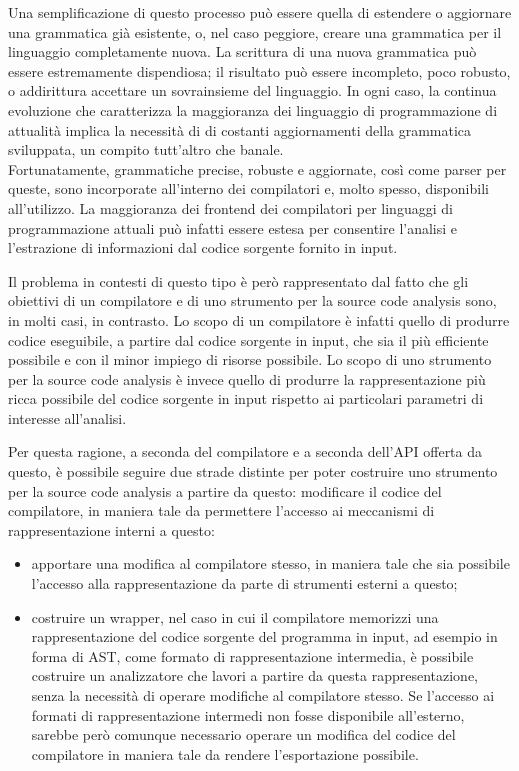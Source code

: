 Una semplificazione di questo processo può essere quella di estendere o
aggiornare una grammatica già esistente, o, nel caso peggiore, creare una
grammatica per il linguaggio completamente nuova. La scrittura di una nuova
grammatica può essere estremamente dispendiosa; il risultato può essere
incompleto, poco robusto, o addirittura accettare un sovrainsieme del
linguaggio. In ogni caso, la continua evoluzione che caratterizza la
maggioranza dei linguaggio di programmazione di attualità implica la necessità
di di costanti aggiornamenti della grammatica sviluppata, un compito tutt’altro
che banale.\\

Fortunatamente, grammatiche precise, robuste e aggiornate, così come parser per
queste, sono incorporate all’interno dei compilatori e, molto spesso,
disponibili all’utilizzo. La maggioranza dei frontend dei compilatori per
linguaggi di programmazione attuali può infatti essere estesa per consentire
l’analisi e l’estrazione di informazioni dal codice sorgente fornito in input.

Il problema in contesti di questo tipo è
però rappresentato dal fatto che gli obiettivi di un compilatore e di uno
strumento per la source code analysis sono, in molti casi, in contrasto. Lo
scopo di un compilatore è infatti quello di produrre codice eseguibile, a
partire dal codice sorgente in input, che sia il più efficiente possibile e con
il minor impiego di risorse possibile. Lo scopo di uno strumento per la source
code analysis è invece quello di produrre la rappresentazione più ricca
possibile del codice sorgente in input rispetto ai particolari parametri di
interesse all’analisi.

Per questa ragione, a seconda del compilatore e a
seconda dell’API offerta da questo, è possibile seguire due strade distinte per
poter costruire uno strumento per la source code analysis a partire da questo:
modificare il codice del compilatore, in maniera tale da permettere l’accesso
ai meccanismi di rappresentazione interni a questo: 

\begin{itemize}

\item apportare una modifica al compilatore stesso, in maniera tale che sia
possibile l'accesso alla rappresentazione da parte di strumenti esterni a
questo;

\item costruire un wrapper, nel caso in cui il compilatore memorizzi una
rappresentazione del codice sorgente del programma in input, ad esempio in
forma di AST, come formato di rappresentazione intermedia, è possibile
costruire un analizzatore che lavori a partire da questa rappresentazione,
senza la necessità di operare modifiche al compilatore stesso. Se l’accesso ai
formati di rappresentazione intermedi non fosse disponibile all’esterno,
sarebbe però comunque necessario operare un modifica del codice del compilatore
in maniera tale da rendere l’esportazione possibile.

\end{itemize}

